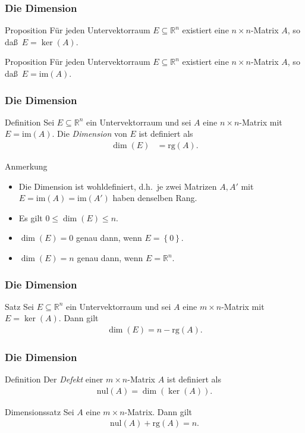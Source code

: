 \documentclass{beamer}
\renewcommand{\emph}[1]{{\textcolor{solarizedRed}{\itshape #1}}}
\newcommand\RR{\mathbb R}
\newcommand\cbc[1]{\left\{{#1}\right\}}
\newcommand{\ue}{\"u}
\newcommand{\im}{\mathrm{im}}
\newcommand{\nul}{\mathrm{nul}}
\newcommand{\rk}{\mathrm{rg}}
\newcommand{\mytitle}{Die Dimension}
\begin{document}
\begin{frame}\frametitle{\mytitle}
	\begin{block}{Proposition}
		F\ue r jeden Untervektorraum $E\subseteq\RR^n$ existiert eine $n\times n$-Matrix $A$, so da\ss\ $E=\ker(A)$.
	\end{block}
\begin{block}{Proposition}
		F\ue r jeden Untervektorraum $E\subseteq\RR^n$ existiert eine $n\times n$-Matrix $A$, so da\ss\ $E=\im(A)$.
	\end{block}
\end{frame}

\begin{frame}\frametitle{\mytitle}
\begin{block}{Definition}
	Sei $E\subseteq\RR^n$ ein Untervektorraum und sei $A$ eine $n\times n$-Matrix mit $E=\im(A)$.
		Die \emph{Dimension} von $E$ ist definiert als
		\begin{align*}
			\dim(E)&=\rk(A).
		\end{align*}
	\end{block}
	\begin{block}{Anmerkung}
	\begin{itemize}
		\item Die Dimension ist wohldefiniert, d.h.\ je zwei Matrizen $A,A'$ mit $E=\im(A)=\im(A')$ haben denselben Rang.
		\item Es gilt $0\leq\dim(E)\leq n$.
		\item $\dim(E)=0$ genau dann, wenn $E=\cbc0$.
		\item $\dim(E)=n$ genau dann, wenn $E=\RR^n$.
	\end{itemize}	
	\end{block}
\end{frame}

\begin{frame}\frametitle{\mytitle}
\begin{block}{Satz}
	Sei $E\subseteq\RR^n$ ein Untervektorraum und sei $A$ eine $m\times n$-Matrix mit $E=\ker(A)$.
	Dann gilt
	\begin{align*}
		\dim(E)=n-\rk(A).
	\end{align*}
	\end{block}
\end{frame}

\begin{frame}\frametitle{\mytitle}
\begin{block}{Definition}
	Der \emph{Defekt} einer $m\times n$-Matrix $A$ ist definiert als
	\begin{align*}
		\nul(A)=\dim(\ker(A)).
	\end{align*}
	\end{block}
\begin{block}{Dimensionssatz}
	Sei $A$ eine $m\times n$-Matrix.
	Dann gilt
	\begin{align*}
		\nul(A)+\rk(A)=n.
	\end{align*}
\end{block}
\end{frame}
\end{document}
